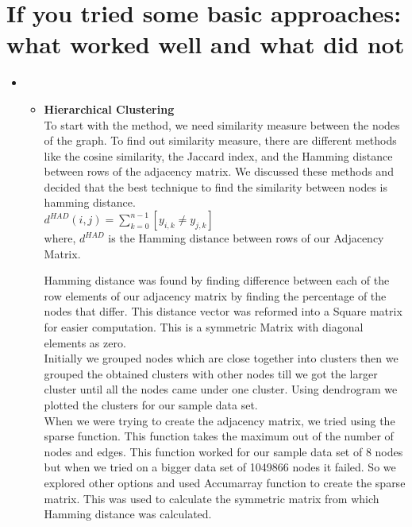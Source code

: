 \documentclass[11pt]{exam}
\begin{document}
\section{ If you tried some basic approaches: what worked well and what did not }

\begin{itemize}
\item[]

\begin{itemize}

Our dataset basically has from nodes and to nodes and we are supposed to find communities in this dataset. So, we referred this paper which discusses about community detection problems with different clustering techniques.  \\

http://snap.stanford.edu/class/cs224w-readings/fortunato10community.pdf

\item\textbf{Hierarchical Clustering}\\
To start with the method, we need similarity measure between the nodes of the graph. To find out similarity measure, there are different methods like the cosine similarity, the Jaccard index, and the Hamming distance between rows of the adjacency matrix. We discussed these methods and decided that the best technique to find the similarity between nodes is hamming distance. \\

$d^{HAD}(i,j)=\sum_{k=0}^{n-1}[y_{i,k} \neq y_{j,k}]$ \\

where, $d^{HAD}$ is the Hamming distance between rows of our Adjacency Matrix.

Hamming distance was found by finding difference between each of the row elements of our adjacency matrix by finding the percentage of the nodes that differ. This distance vector was reformed into a Square matrix for easier computation. This is a symmetric Matrix with diagonal elements as zero. \\

Initially we grouped nodes which are close together into clusters then we grouped the obtained clusters with other nodes till we got the larger cluster until all the nodes came under one cluster.
Using dendrogram we plotted the clusters for our sample data set.\\

When we were trying to create the adjacency matrix, we tried using the sparse function. This function takes the maximum out of the number of nodes and edges. This function worked for our sample data set of 8 nodes but when we tried on a bigger data set of 1049866 nodes it failed. So we explored other options and used Accumarray function to create the sparse matrix. This was used to calculate the symmetric matrix from which Hamming distance was calculated.\\



\end{itemize}
\end{itemize}
\end{document}
